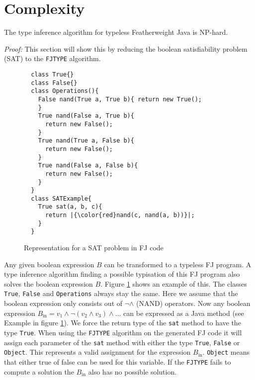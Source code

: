 \section{Complexity}
\label{sec:complexity}

\begin{theorem}[NP-Hardness]
  \label{theo:np-hardness}
  The type inference algorithm for typeless Featherweight Java is NP-hard.
\end{theorem}

\textit{Proof:} This section will show this by reducing the boolean satisfiability problem (SAT) to the \texttt{FJTYPE} algorithm.

\begin{figure}
\begin{lstlisting}
  class True{}
  class False{}
  class Operations(){
    False nand(True a, True b){ return new True();
    }
    True nand(False a, True b){
      return new False();
    }
    True nand(True a, False b){
      return new False();
    }
    True nand(False a, False b){
      return new False();
    }
  }
  class SATExample{
    True sat(a, b, c){
      return |{\color{red}nand(c, nand(a, b))}|;
    }
  }
\end{lstlisting}

\caption{Representation for a SAT problem in FJ code}
\label{fig:fjSATcode}
\end{figure}

Any given boolean expression $B$ can be transformed to a typeless FJ program.
A type inference algorithm finding a possible typisation of this FJ program also solves the boolean expression $B$.
Figure \ref{fig:fjSATcode} shows an example of this.
The classes \texttt{True}, \texttt{False} and \texttt{Operations} always stay the same.
Here we assume that the boolean expression only consists out of $\neg \land$ (NAND) operators.
Now any boolean expression $B_\text{in} = v_1 \land \neg (v_2 \land v_3) \land \ldots$ can be expressed as a Java method
(see  Example in figure \ref{fig:fjSATcode}).
We force the return type of the \texttt{sat} method to have the type \texttt{True}.
When using the \texttt{FJTYPE} algorithm on the generated FJ code it will
assign each parameter of the \texttt{sat} method with either the type \texttt{True}, \texttt{False}
or \texttt{Object}.
This represents a valid assignment for the expression $B_\text{in}$.
\texttt{Object} means that either true of false can be used for this variable.
If the \texttt{FJTYPE} fails to compute a solution the $B_\text{in}$ also has no possible solution.

